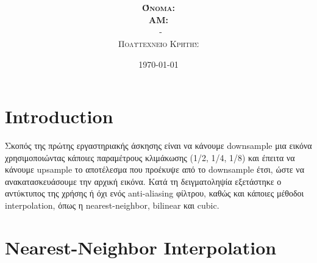 \documentclass{article}
\title{\underline{\textbf{\assignmentNumber}}}
\author{\textsc{\textbf{Όνομα:}}  \studentName\\
		\textsc{\textbf{ΑΜ:}}  \studentNumber\\
		\course \ - \courseName\\ 
		\textsc{Πολυτεχνείο Κρήτης}
}
\date{\today}
\begin{document}
	\maketitle

\section*{Introduction}
	Σκοπός της πρώτης εργαστηριακής άσκησης είναι να κάνουμε downsample μια εικόνα χρησιμοποιώντας κάποιες παραμέτρους κλιμάκωσης (1/2, 1/4, 1/8) και έπειτα να κάνουμε upsample το αποτέλεσμα που προέκυψε από το downsample έτσι, ώστε να ανακατασκευάσουμε την αρχική εικόνα. Κατά τη δειγματοληψία εξετάστηκε ο αντύκτυπος της χρήσης ή όχι ενός anti-aliasing φίλτρου, καθώς και κάποιες μέθοδοι interpolation, όπως η nearest-neighbor, bilinear και cubic.
	
\section*{Nearest-Neighbor Interpolation}	
\end{document}
